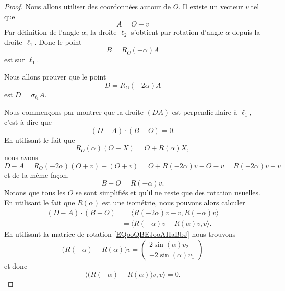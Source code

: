 \begin{proof}
    Nous allons utiliser des coordonnées autour de \( O\). Il existe un vecteur \( v\) tel que
    \begin{equation}
        A=O+v
    \end{equation}
    Par définition de l'angle \( \alpha\), la droite \( \ell_2\) s'obtient par rotation d'angle \( \alpha\) depuis la droite \( \ell_1\). Donc le point
    \begin{equation}
        B=R_O(-\alpha)A
    \end{equation}
    est sur \( \ell_1\).

    Nous allons prouver que le point
    \begin{equation}
        D=R_O(-2\alpha)A
    \end{equation}
    est \( D=\sigma_{\ell_1}A\).

    Nous commençons par montrer que la droite \( (DA)\) est perpendiculaire à \( \ell_1\), c'est à dire que
    \begin{equation}
        (D-A)\cdot (B-O)=0.
    \end{equation}
    En utilisant le fait que 
    \begin{equation}
        R_O(\alpha)(O+X)=O+R(\alpha)X,
    \end{equation}
    nous avons
    \begin{equation}
        D-A=R_O(-2\alpha)(O+v)-(O+v)=O+R(-2\alpha)v-O-v=R(-2\alpha)v-v
    \end{equation}
    et de la même façon,
    \begin{equation}
        B-O=R(-\alpha)v.
    \end{equation}
    Notons que tous les \( O\) se sont simplifiés et qu'il ne reste que des rotation usuelles. En utilisant le fait que \( R(\alpha)\) est une isométrie, nous pouvons alors calculer
    \begin{subequations}
        \begin{align}
            (D-A)\cdot (B-O)&=\langle R(-2\alpha)v-v, R(-\alpha)v\rangle \\
            &=\langle R(-\alpha)v-R(\alpha)v, v\rangle.
        \end{align}
    \end{subequations}
    En utilisant la matrice de rotation \eqref{EQooQBEJooAHaBbJ} nous trouvons
    \begin{equation}
        \big( R(-\alpha)-R(\alpha) \big)v=\begin{pmatrix}
            2\sin(\alpha)v_2    \\ 
            -2\sin(\alpha)v_1    
        \end{pmatrix}
    \end{equation}
    et donc
    \begin{equation}
        \langle  \big( R(-\alpha)-R(\alpha) \big)v  , v\rangle =0.
    \end{equation}


\end{proof}
